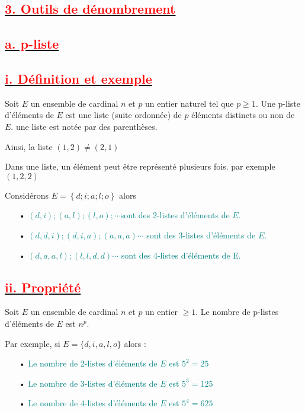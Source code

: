 \documentclass[12pt]{article}
\begin{document}
\subsection*{\underline{\textbf{\textcolor{red}{3. Outils de dénombrement}}}}
\subsection*{\underline{\textbf{\textcolor{red}{a. p-liste}}}}
\subsection*{\underline{\textbf{\textcolor{red}{i. Définition et exemple }}}}
Soit $E$ un ensemble de cardinal $n$ et $p$ un entier naturel tel que $p \geq 1$. Une p-liste d’éléments de $E$ est une liste (suite ordonnée) de $p$ éléments distincts ou non de $E.$
une liste est notée par des parenthèses.

Ainsi, la liste $(1,2)\neq (2,1)$

Dans une liste, un élément peut être représenté plusieurs fois. par exemple $(1,2,2)$

Considérons $E = \left\lbrace d; i; a ; l ; o\right\rbrace $ alors

\begin{itemize}
\item[•] \textcolor{teal}{$(d,i); (a,l) ; (l,o) ;\cdots$sont des 2-listes d’éléments de $E$.}
\item[•] \textcolor{teal}{$(d,d,i) ; (d,i,a) ;(a,a,a)\cdots$ sont des 3-listes d’éléments de $E$.}
\item[•] \textcolor{teal}{$(d,a,a,l) ; (l,l,d,d)\cdots$ sont des 4-listes d’éléments de E.}
\end{itemize}
\subsection*{\underline{\textbf{\textcolor{red}{ii. Propriété}}}}
Soit \(E\) un ensemble de cardinal \(n\) et \(p\) un entier \(\geq 1\). Le nombre de p-listes d’éléments de \(E\) est \(n^{p}\).

Par exemple, si \(E = \{d, i,  a, l , o\}\) alors :
\begin{itemize}
    \item[•] \textcolor{teal}{Le nombre de 2-listes d’éléments de \(E\) est \(5^{2} = 25\)}
    \item[•] \textcolor{teal}{Le nombre de 3-listes d’éléments de \(E\) est \(5^{3} = 125\)}
    \item[•] \textcolor{teal}{Le nombre de 4-listes d’éléments de \(E\) est \(5^{4} = 625\)}
\end{itemize}
\end{document}
